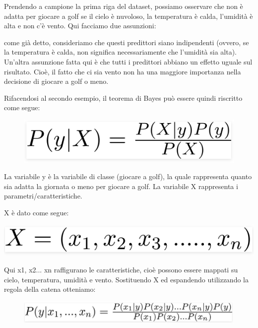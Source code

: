 Prendendo a campione la prima riga del dataset, possiamo osservare che non è adatta per giocare a golf se il cielo è nuvoloso, la temperatura è calda, l'umidità è alta e non c'è vento. Qui facciamo due assunzioni: 

come già detto, consideriamo che questi predittori siano indipendenti (ovvero, se la temperatura è calda, non significa necessariamente che l'umidità sia alta). Un'altra assunzione fatta qui è che tutti i predittori abbiano un eﬀetto uguale sul risultato. Cioè, il fatto che ci sia vento non ha una maggiore importanza nella  decisione di giocare a golf o meno. 

Rifacendosi al secondo esempio, il teorema di Bayes può essere quindi riscritto come segue:
\newpage
\begin{figure}
    \begin{center}    
        \includegraphics[width=0.8\linewidth]{images/image19.png}
    \end{center}
\end{figure}
La variabile y è la variabile di classe (giocare a golf), la quale rappresenta quanto sia adatta la giornata o meno per giocare a golf. La variabile X rappresenta i parametri/caratteristiche.

X è dato come segue:
\begin{center}    
    \includegraphics[width=0.9\linewidth]{images/image20.png}
\end{center}


Qui x1, x2... xn raffigurano le caratteristiche, cioè possono essere mappati su cielo, temperatura, umidità e vento. Sostituendo X ed espandendo utilizzando la regola della catena otteniamo:
\begin{figure}
    \begin{center}    
        \includegraphics[width=0.9\linewidth]{images/image21.jpeg}
    \end{center}
\end{figure}

